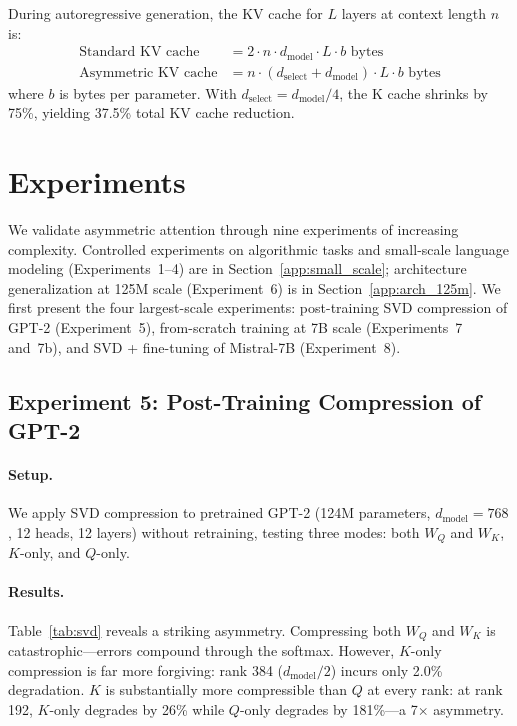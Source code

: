 \documentclass[11pt]{article}
\newcommand{\dmodel}{d_{\text{model}}}
\newcommand{\dselect}{d_{\text{select}}}
\begin{document}
During autoregressive generation, the KV cache for $L$ layers at context length $n$ is:
\begin{align}
\text{Standard KV cache} &= 2 \cdot n \cdot \dmodel \cdot L \cdot b \text{ bytes} \\
\text{Asymmetric KV cache} &= n \cdot (\dselect + \dmodel) \cdot L \cdot b \text{ bytes}
\end{align}
where $b$ is bytes per parameter. With $\dselect = \dmodel / 4$, the K cache shrinks by 75\%, yielding 37.5\% total KV cache reduction.


\section{Experiments}

We validate asymmetric attention through nine experiments of increasing complexity. Controlled experiments on algorithmic tasks and small-scale language modeling (Experiments~1--4) are in Section~\ref{app:small_scale}; architecture generalization at 125M scale (Experiment~6) is in Section~\ref{app:arch_125m}. We first present the four largest-scale experiments: post-training SVD compression of GPT-2 (Experiment~5), from-scratch training at 7B scale (Experiments~7 and~7b), and SVD + fine-tuning of Mistral-7B (Experiment~8).


\subsection{Experiment 5: Post-Training Compression of GPT-2}

\paragraph{Setup.}
We apply SVD compression to pretrained GPT-2 (124M parameters, $\dmodel = 768$, 12 heads, 12 layers) without retraining, testing three modes: both $W_Q$ and $W_K$, $K$-only, and $Q$-only.

\paragraph{Results.}
Table~\ref{tab:svd} reveals a striking asymmetry. Compressing both $W_Q$ and $W_K$ is catastrophic---errors compound through the softmax. However, $K$-only compression is far more forgiving: rank 384 ($\dmodel/2$) incurs only 2.0\% degradation. $K$ is substantially more compressible than $Q$ at every rank: at rank 192, $K$-only degrades by 26\% while $Q$-only degrades by 181\%---a 7$\times$ asymmetry.
\end{document}
